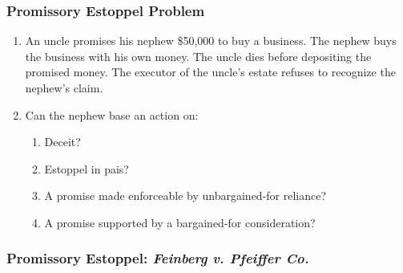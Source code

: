\subsubsection{Promissory Estoppel Problem}

\begin{enumerate}
    \item An uncle promises his nephew \$50,000 to buy a business. The nephew 
    buys the business with his own money. The uncle dies before depositing the 
    promised money. The executor of the uncle's estate refuses to recognize 
    the nephew's claim.
    \item Can the nephew base an action on:
    \begin{enumerate}
        \item Deceit?
        \item Estoppel in pais?
        \item A promise made enforceable by unbargained-for reliance?
        \item A promise supported by a bargained-for consideration?
    \end{enumerate}
\end{enumerate}

\subsubsection{Promissory Estoppel: \emph{Feinberg v. Pfeiffer Co.}}

